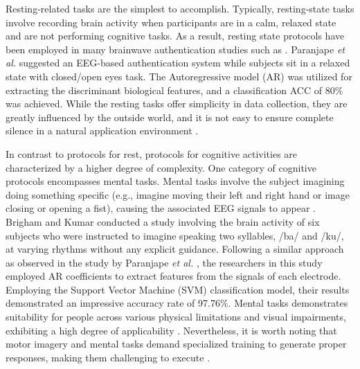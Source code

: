 Resting-related tasks are the simplest to accomplish. Typically, resting-state tasks involve recording brain activity when participants are in a calm, relaxed state and are not performing cognitive tasks. 
As a result, resting state protocols have been employed in many brainwave authentication studies such as \cite{nakanishi2009eeg, thomas2018eeg}. Paranjape \textit{et al.} \cite{paranjape2001electroencephalogram} suggested an EEG-based authentication system while subjects sit in a relaxed state with closed/open eyes task. The Autoregressive model (AR) was utilized for extracting the discriminant biological features, and a classification ACC of 80$\%$ was achieved. While the resting tasks offer simplicity in data collection, they are greatly influenced by the outside world, and it is not easy to ensure complete silence in a natural application environment \cite{zhang2021review}. 
\smallskip

In contrast to protocols for rest, protocols for cognitive activities are characterized by a higher degree of complexity. One category of cognitive protocols encompasses mental tasks. Mental tasks involve the subject imagining doing something specific (e.g., imagine moving their left and right hand or image closing or opening a fist), causing the associated EEG signals to appear \cite{survey_brain_biometrics}. Brigham and Kumar \cite{brigham2010subject} conducted a study involving the brain activity of six subjects who were instructed to imagine speaking two syllables, /ba/ and /ku/, at varying rhythms without any explicit guidance. Following a similar approach as observed in the study by Paranjape \textit{et al.} \cite{paranjape2001electroencephalogram}, the researchers in this study employed AR coefficients to extract features from the signals of each electrode. Employing the Support Vector Machine (SVM) classification model, their results demonstrated an impressive accuracy rate of 97.76$\%$. Mental tasks demonstrates suitability for people across various physical limitations and visual impairments, exhibiting a high degree of applicability \cite{zhang2021review}. Nevertheless, it is worth noting that motor imagery and mental tasks demand specialized training to generate proper responses, making them challenging to execute \cite{brigham2010subject}.
\smallskip

